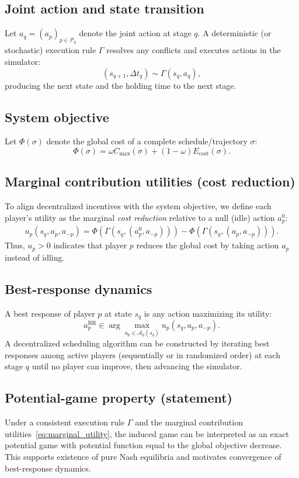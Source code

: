 \documentclass[preprint, 3p, review, 12pt]{elsarticle}
\begin{document}
\subsection{Joint action and state transition}
Let $a_q=(a_p)_{p\in\mathcal{P}_q}$ denote the joint action at stage $q$.
A deterministic (or stochastic) execution rule $\Gamma$ resolves any conflicts and executes actions in the simulator:
\[
(s_{q+1},\Delta t_q)\sim \Gamma(s_q,a_q),
\]
producing the next state and the holding time to the next stage.

\subsection{System objective}
Let $\Phi(\sigma)$ denote the global cost of a complete schedule/trajectory $\sigma$:
\[
\Phi(\sigma)=\omega C_{\max}(\sigma) + (1-\omega)E_{\mathrm{cost}}(\sigma).
\]

\subsection{Marginal contribution utilities (cost reduction)}
To align decentralized incentives with the system objective, we define each player's utility as the marginal
\emph{cost reduction} relative to a null (idle) action $a_p^0$:
\begin{align}
u_p(s_q,a_p,a_{-p})
=
\Phi\!\left(\Gamma(s_q,(a_p^0,a_{-p}))\right)
-
\Phi\!\left(\Gamma(s_q,(a_p,a_{-p}))\right).
\label{eq:marginal_utility}
\end{align}
Thus, $u_p>0$ indicates that player $p$ reduces the global cost by taking action $a_p$ instead of idling.

\subsection{Best-response dynamics}
A best response of player $p$ at state $s_q$ is any action maximizing its utility:
\[
a_p^{\mathrm{BR}} \in \arg\max_{a_p\in\mathcal{A}_p(s_q)} u_p(s_q,a_p,a_{-p}).
\]
A decentralized scheduling algorithm can be constructed by iterating best responses among active players
(sequentially or in randomized order) at each stage $q$ until no player can improve, then advancing the simulator.

\subsection{Potential-game property (statement)}
Under a consistent execution rule $\Gamma$ and the marginal contribution utilities~\eqref{eq:marginal_utility}, the induced game can be interpreted as an exact potential game with potential function equal to the global objective decrease.
This supports existence of pure Nash equilibria and motivates convergence of best-response dynamics.
\end{document}
